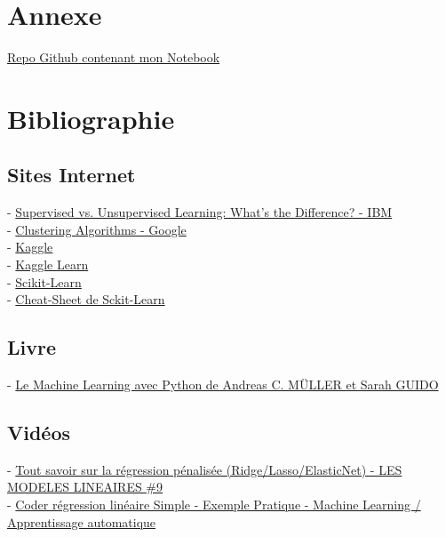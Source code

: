 \chapter{Annexe}

\href{https://github.com/benjamin-milhet/F1_Machine_Learning}{Repo Github contenant mon Notebook}

\chapter{Bibliographie}

\section{Sites Internet}

 - \href{https://www.ibm.com/cloud/blog/supervised-vs-unsupervised-learning}{Supervised vs. Unsupervised Learning: What’s the Difference? - IBM}\\

 - \href{https://developers.google.com/machine-learning/clustering/clustering-algorithms?hl=en}{Clustering Algorithms - Google}\\

 - \href{https://www.kaggle.com/competitions}{Kaggle}\\

 - \href{https://www.kaggle.com/learn}{Kaggle Learn}\\

 - \href{https://scikit-learn.org/stable/index.html}{Scikit-Learn}\\

 - \href{https://scikit-learn.org/stable/tutorial/machine_learning_map/index.html}{Cheat-Sheet de Sckit-Learn}


\section{Livre}
 - \href{https://www.oreilly.com/library/view/le-machine-learning/9782412034460/}{Le Machine Learning avec Python de Andreas C. MÜLLER et Sarah GUIDO}

\section{Vidéos}

 - \href{https://www.youtube.com/watch?v=YfAgP-xKi30&list=LL&index=2}{Tout savoir sur la régression pénalisée (Ridge/Lasso/ElasticNet) - LES MODELES LINEAIRES \#9 }\\

 - \href{https://www.youtube.com/watch?v=WLmOFlSxYTY&list=LL&index=25}{ Coder régression linéaire Simple - Exemple Pratique - Machine Learning / Apprentissage automatique }



